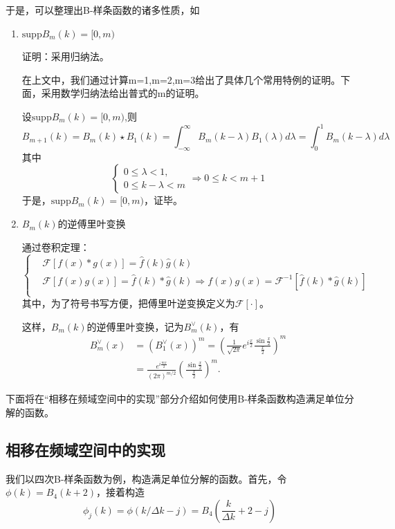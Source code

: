 于是，可以整理出B-样条函数的诸多性质，如
\begin{enumerate}
    \item $\text{supp} B_m(k)=[0,m)$
    
    证明：采用归纳法。

    在上文中，我们通过计算m=1,m=2,m=3给出了具体几个常用特例的证明。下面，采用数学归纳法给出普式的m的证明。

    设$\text{supp} B_m(k)=[0,m)$,则
    \begin{equation*}
    B_{m+1}(k)=B_{m}(k)\star B_{1}(k)=\int_{-\infty}^{\infty}B_{m}(k-\lambda)B_{1}(\lambda)d\lambda=
\int_{0}^{1}B_{m}(k-\lambda)d\lambda
\end{equation*}
其中
\begin{equation*}
    \left\{\begin{matrix} 
0 \le \lambda <1,\\
0\le k-\lambda <m
\end{matrix}\right. 
\Rightarrow 0\le k <m+1
\end{equation*}
于是，$\text{supp} B_m(k)=[0,m)$，证毕。
    \item $B_m(k)$的逆傅里叶变换
    
    通过卷积定理：
    \begin{equation}
        \left\{\begin{matrix} 
& \mathcal{F} [f(x)*g(x)]= \hat{f}(k)\hat{g}(k)  \\
& \mathcal{F}[f(x)g(x)] = \hat{f}(k)*\hat{g}(k)\Rightarrow f(x)g(x) = \mathcal{F}^{-1}[\hat{f}(k)*\hat{g}(k)] \\
\end{matrix}\right. 
    \end{equation}
其中，为了符号书写方便，把傅里叶逆变换定义为$\mathcal{F[\cdot ]}$。

这样，$B_m(k)$的逆傅里叶变换，记为$B_m^{\vee}(k)$，有
\begin{align}
B_{m}^{\vee}(x)  &  =\left(  B_{1}^{\vee}(x)\right)  ^{m}=\left(  \frac
{1}{\sqrt{2\pi}}e^{i\frac{x}{2}}\frac{\sin\frac{x}{2}}{\frac{x}{2}}\right)
^{m}\nonumber\\
&  =\frac{e^{i\frac{mx}{2}}}{\left(  2\pi\right)  ^{m/2}}\left(  \frac
{\sin\frac{x}{2}}{\frac{x}{2}}\right)  ^{m}.
\end{align}
\end{enumerate}
下面将在“相移在频域空间中的实现”部分介绍如何使用B-样条函数构造满足单位分解的函数。


\subsection{相移在频域空间中的实现}
我们以四次B-样条函数为例，构造满足单位分解的函数。首先，令$\phi(k)=B_{4}(k+2)$，接着构造
\begin{equation}
    \phi_j(k)=\phi(k/\Delta k-j)=B_4(\frac{k}{\Delta k}+2-j)
\end{equation}

